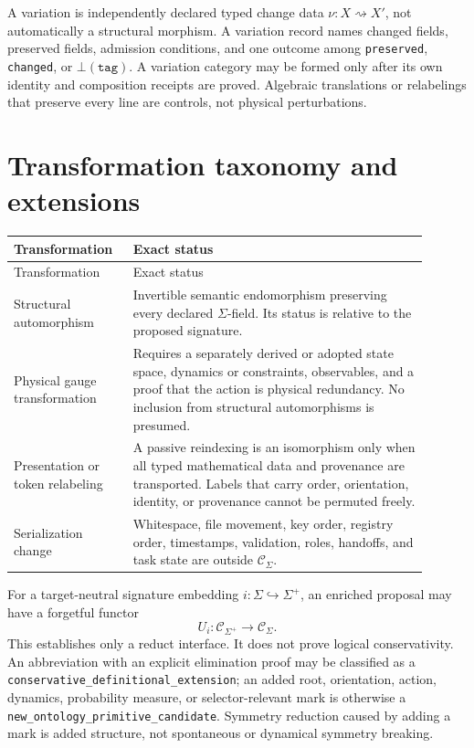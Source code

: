 \documentclass[11pt]{article}
\begin{document}
A variation is independently declared typed change data
\(\nu:X\rightsquigarrow X'\), not automatically a structural morphism. A
variation record names changed fields, preserved fields, admission conditions,
and one outcome among \texttt{preserved}, \texttt{changed}, or
\(\bot(\texttt{tag})\). A variation category may be formed only after its own
identity and composition receipts are proved. Algebraic translations or
relabelings that preserve every line are controls, not physical perturbations.

\section{Transformation taxonomy and extensions}

\begin{longtable}{p{0.24\linewidth}p{0.66\linewidth}}
\toprule
Transformation & Exact status \\
\midrule
\endfirsthead
\toprule
Transformation & Exact status \\
\midrule
\endhead
Structural automorphism & Invertible semantic endomorphism preserving every
declared \(\Sigma\)-field. Its status is relative to the proposed signature. \\
Physical gauge transformation & Requires a separately derived or adopted state
space, dynamics or constraints, observables, and a proof that the action is
physical redundancy. No inclusion from structural automorphisms is presumed. \\
Presentation or token relabeling & A passive reindexing is an isomorphism only
when all typed mathematical data and provenance are transported. Labels that
carry order, orientation, identity, or provenance cannot be permuted freely. \\
Serialization change & Whitespace, file movement, key order, registry order,
timestamps, validation, roles, handoffs, and task state are outside
\(\mathcal C_{\Sigma}\). \\
\bottomrule
\end{longtable}

For a target-neutral signature embedding \(i:\Sigma\hookrightarrow\Sigma^+\),
an enriched proposal may have a forgetful functor
\[
U_i:\mathcal C_{\Sigma^+}\longrightarrow\mathcal C_{\Sigma}.
\]
This establishes only a reduct interface. It does not prove logical
conservativity. An abbreviation with an explicit elimination proof may be
classified as a \texttt{conservative\_definitional\_extension}; an added root,
orientation, action, dynamics, probability measure, or selector-relevant mark
is otherwise a \texttt{new\_ontology\_primitive\_candidate}. Symmetry reduction
caused by adding a mark is added structure, not spontaneous or dynamical
symmetry breaking.
\end{document}
